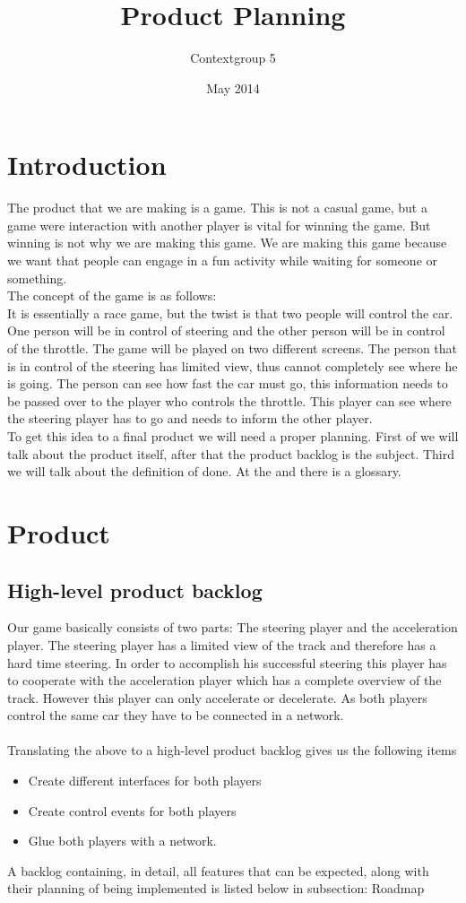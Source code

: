 \documentclass{article}
\title{Product Planning}
\author{Contextgroup 5}
\date{May 2014}
\begin{document}
\maketitle

\section{Introduction}
The product that we are making is a game. This is not a casual game, but a game were interaction with another player is vital for winning the game. But winning is not why we are making this game. We are making this game because we want that people can engage in a fun activity while waiting for someone or something.\\
The concept of the game is as follows:\\
It is essentially a race game, but the twist is that two people will control the car. One person will be in control of steering and the other person will be in control of the throttle. The game will be played on two different screens. The person that is in control of the steering has limited view, thus cannot completely see where he is going. The person can see how fast the car must go, this information needs to be passed over to the player who controls the throttle. This player can see where the steering player has to go and needs to inform the other player.\\
To get this idea to a final product we will need a proper planning. First of we will talk about the product itself, after that the product backlog is the subject. Third we will talk about the definition of done. At the and there is a glossary.
\section{Product}
\subsection{High-level product backlog}
Our game basically consists of two parts: The \gls{steering player} and the \gls{acceleration player}. The steering player has a limited view of the track and therefore has a hard time steering. In order to accomplish his successful steering this player has to cooperate with the acceleration player which has a complete overview of the track. However this player can only accelerate or decelerate. As both players control the same car they have to be connected in a network. \\\\
Translating the above to a high-level product backlog gives us the following items
\begin{itemize}
	\item Create different interfaces for both players
	\item Create control events for both players
	\item Glue both players with a network.
\end{itemize}
A backlog containing, in detail, all features that can be expected, along with their planning of being implemented is listed below in subsection: Roadmap
\end{document}
